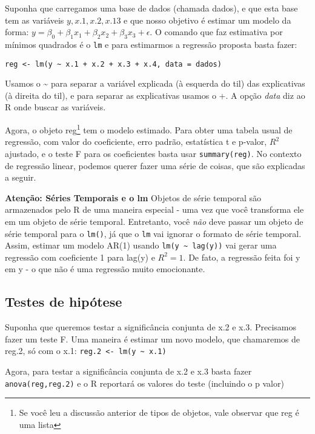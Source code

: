 \documentclass[]{book}
\let\rmarkdownfootnote\footnote%
\def\footnote{\protect\rmarkdownfootnote}
\begin{document}
Suponha que carregamos uma base de dados (chamada dados), e que esta
base tem as variáveis \(y, x.1,x.2,x.13\) e que nosso objetivo é estimar
um modelo da forma:
\(y = \beta_0 + \beta_1 x_1 + \beta_2 x_2 + \beta_3 x_3 + \epsilon\). O
comando que faz estimativa por mínimos quadrados é o \texttt{lm} e para
estimarmos a regressão proposta basta fazer:

\begin{verbatim}
reg <- lm(y ~ x.1 + x.2 + x.3 + x.4, data = dados)
\end{verbatim}

Usamos o \textasciitilde{} para separar a variável explicada (à esquerda
do til) das explicativas (à direita do til), e para separar as
explicativas usamos o +. A opção \emph{data} diz ao R onde buscar as
variáveis.

Agora, o objeto reg\footnote{Se você leu a discussão anterior de tipos
  de objetos, vale observar que reg é uma lista} tem o modelo estimado.
Para obter uma tabela usual de regressão, com valor do coeficiente, erro
padrão, estatística t e p-valor, \(R^2\) ajustado, e o teste F para os
coeficientes basta usar \texttt{summary(reg)}. No contexto de regressão
linear, podemos querer fazer uma série de coisas, que são explicadas a
seguir.

\textbf{Atenção: Séries Temporais e o lm} Objetos de série temporal são
armazenados pelo R de uma maneira especial - uma vez que você transforma
ele em um objeto de série temporal. Entretanto, você \emph{não} deve
passar um objeto de série temporal para o \texttt{lm()}, já que o
\texttt{lm} vai ignorar o formato de série temporal. Assim, estimar um
modelo AR(1) usando \texttt{lm(y\ \textasciitilde{}\ lag(y))} vai gerar
uma regressão com coeficiente 1 para lag(y) e \(R^2 = 1\). De fato, a
regressão feita foi y em y - o que não é uma regressão muito
emocionante.

\subsection{Testes de hipótese}\label{testes-de-hipotese}

Suponha que queremos testar a significância conjunta de x.2 e x.3.
Precisamos fazer um teste F. Uma maneira é estimar um novo modelo, que
chamaremos de reg.2, só com o x.1:
\texttt{reg.2\ \textless{}-\ lm(y\ \textasciitilde{}\ x.1)}

Agora, para testar a significância conjunta de x.2 e x.3 basta fazer
\texttt{anova(reg,reg.2)} e o R reportará os valores do teste (incluindo
o p valor)
\end{document}
